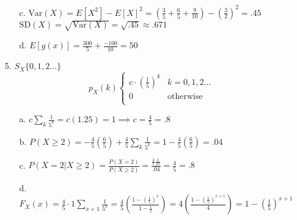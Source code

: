 \documentclass[11pt]{amsart}
\theoremstyle{definition}
\begin{document}
\begin{itemize}
\begin{itemize}
    \item[c.] $\text{Var}(X)=E[X^2]-E[X]^2
                =(\frac35+\frac 65+\frac9{10})-(\frac32)^2=.45$ \\
              $\text{SD}(X)=\sqrt{\text{Var}(X)}=\sqrt{.45}\approx.671$

    \item[d.] $E[g(x)]=\frac{300}5+\frac{-100}{10}=50$
 
\end{itemize}

\item[5.] $S_X\{0,1,2\ldots\}$
\begin{equation*}
    p_X(k)
    \begin{cases}
        c\cdot (\frac15)^k &k=0,1,2\ldots \\
        0  &\text{otherwise} \\
    \end{cases}
\end{equation*}
\begin{itemize}
    \item[a.] $ c\sum_k \frac{1}{5^k}=c(1.25)=1\implies c=\frac45=.8$

    \item[b.] $P(X\ge 2)=-\frac45(\frac65)+\frac45\sum_k \frac{1}{5^k}=1-\frac45(\frac65)=.04$

    \item[c.] $P(X=2|X\ge 2)=\frac{P(X=2)}{P(X\ge 2)}=\frac{\frac{4}{5}\frac{1}{25}}{.04}=\frac 45=.8$

    \item[d.] $F_X(x)=\frac45\cdot 1\sum_{x+1} \frac1{5^x}
              =\frac45(\frac{1-(\frac15)^x}{1-\frac15})
              =4(\frac{1-(\frac15)^{x+1}}4)=1-(\frac 15)^{x+1}$
\end{itemize}

\end{itemize}
\end{document}
